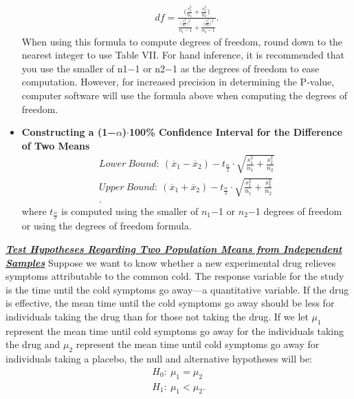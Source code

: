 \documentclass{report}
\begin{document}
\begin{itemize}
            \bigbreak \noindent 
            \begin{align*}
                df = \frac{\bigg(\frac{s_{1}^{2}}{n_{1}} + \frac{s_{2}^{2}}{n_{2}}\bigg)}{\frac{\bigg(\frac{s_{1}^{2}}{n_{1}}\bigg)^{2}}{n_{1}-1}+ \frac{\bigg(\frac{s_{2}^{2}}{n_{2}}\bigg)^{2}}{n_{2}-1}}
            .\end{align*}
            \bigbreak \noindent 
            When using this formula to compute degrees of freedom, round down to the nearest integer to use Table VII. For hand inference, it is recommended that you use the smaller of n1−1 or n2−1 as the degrees of freedom to ease computation. However, for increased precision in determining the P-value, computer software will use the formula above when computing the degrees of freedom.
        \item \textbf{Constructing a (1−$\alpha$)$\cdot  $100\% Confidence Interval for the Difference of Two Means}
            \begin{align*}
                Lower\ Bound:\ (\overline{x}_{1} - \overline{x}_{2}) - t_{\frac{\alpha}{2}} \cdot \sqrt{\frac{s_{1}^{2}}{n_{1}} + \frac{s_{2}^{2}}{n_{2}}} \\
                Upper\ Bound:\ (\overline{x}_{1} + \overline{x}_{2}) - t_{\frac{\alpha}{2}} \cdot \sqrt{\frac{s_{1}^{2}}{n_{1}} + \frac{s_{2}^{2}}{n_{2}}} \\
            .\end{align*}
            where $t_{\frac{\alpha}{2}} $ is computed using the smaller of $n_{1} $−1 or $n_{2}$−1 degrees of freedom or using the degrees of freedom formula.
    \end{itemize}
    \pagebreak \bigbreak \noindent 
    \textbf{\textit{\underline{Test Hypotheses Regarding Two Population Means from Independent Samples}}}
    \bigbreak \noindent 
    Suppose we want to know whether a new experimental drug relieves symptoms attributable to the common cold. The response variable for the study is the time until the cold symptoms go away---a quantitative variable. If the drug is effective, the mean time until the cold symptoms go away should be less for individuals taking the drug than for those not taking the drug. If we let $\mu_1$ represent the mean time until cold symptoms go away for the individuals taking the drug and $\mu_2$ represent the mean time until cold symptoms go away for individuals taking a placebo, the null and alternative hypotheses will be:
    \bigbreak \noindent 
    \begin{align*}
        H_{0}:\ \mu_{1} =  \mu_{2} \\
        H_{1}:\ \mu_{1} < \mu_{2}
    .\end{align*}
\end{document}
